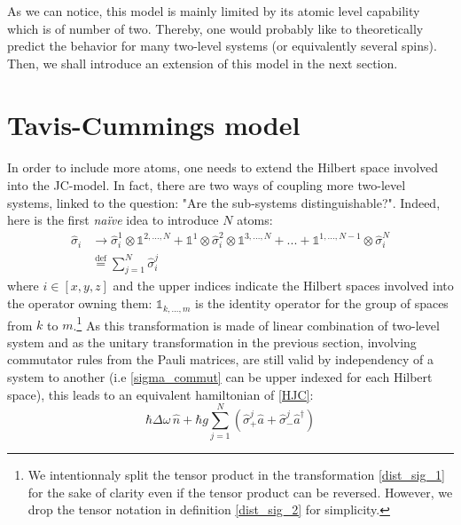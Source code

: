 \documentclass[12pt]{report}
\begin{document}
As we can notice, this model is mainly limited by its atomic level capability which is of number of two. Thereby, one would probably like to theoretically predict the behavior for many two-level systems (or equivalently several spins). Then, we shall introduce an extension of this model in the next section.

\section{Tavis-Cummings model}
\paragraph{}

In order to include more atoms, one needs to extend the Hilbert space involved into the JC-model. In fact, there are two ways of coupling more two-level systems, linked to the question: "Are the sub-systems distinguishable?". Indeed, here is the first \textit{naïve} idea to introduce $N$ atoms:
\begin{align}
\label{dist_sig_1}
\hat{\sigma}_i &\rightarrow \hat{\sigma}_i^1 \otimes \mathbb{1}^{2,...,N} + \mathbb{1}^{1} \otimes \hat{\sigma}_i^2 \otimes \mathbb{1}^{3,...,N} + ... + \mathbb{1}^{1,...,N-1} \otimes \hat{\sigma}_i^N\\
\label{dist_sig_2}
&\stackrel{\text{def}}{=} \sum_{j=1}^{N} \hat{\sigma}_i^j
\end{align}
where $i \in \left[x,y,z\right]$ and the upper indices indicate the Hilbert spaces involved into the operator owning them: $\mathbb{1}_{k,...,m}$ is the identity operator for the group of spaces from $k$ to $m$.\footnote{We intentionnaly split the tensor product in the transformation \eqref{dist_sig_1} for the sake of clarity even if the tensor product can be reversed. However, we drop the tensor notation in definition \eqref{dist_sig_2} for simplicity.}
As this transformation is made of linear combination of two-level system and as the unitary transformation in the previous section, involving commutator rules from the Pauli matrices, are still valid by independency of a system to another (i.e \eqref{sigma_commut} can be upper indexed for each Hilbert space), this leads to an equivalent hamiltonian of \eqref{HJC}:
\begin{equation}
\hbar\Delta\omega\,\hat{n} + \hbar g \sum_{j=1}^{N} \left(\hat{\sigma}_+^j \hat{a} + \hat{\sigma}_-^j \hat{a}^{\dag} \right)
\end{equation}
\end{document}
